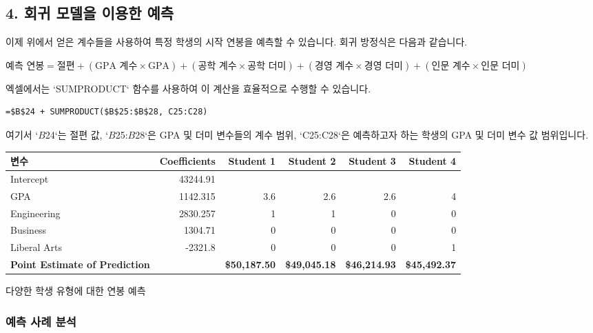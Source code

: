 \documentclass[11pt,a4paper]{article}
\begin{document}
\subsection*{4. 회귀 모델을 이용한 예측}

이제 위에서 얻은 계수들을 사용하여 특정 학생의 시작 연봉을 예측할 수 있습니다. 회귀 방정식은 다음과 같습니다.

$\text{예측 연봉} = \text{절편} + (\text{GPA 계수} \times \text{GPA}) + (\text{공학 계수} \times \text{공학 더미}) + (\text{경영 계수} \times \text{경영 더미}) + (\text{인문 계수} \times \text{인문 더미})$

엑셀에서는 `SUMPRODUCT` 함수를 사용하여 이 계산을 효율적으로 수행할 수 있습니다.

\begin{lstlisting}[caption={엑셀 SUMPRODUCT 함수를 이용한 예측 공식}, label={lst:sumproduct_formula}]
=$B$24 + SUMPRODUCT($B$25:$B$28, C25:C28)
\end{lstlisting}
여기서 `$B$24`는 절편 값, `$B$25:$B$28`은 GPA 및 더미 변수들의 계수 범위, `C25:C28`은 예측하고자 하는 학생의 GPA 및 더미 변수 값 범위입니다.

\begin{adjustbox}{width=\textwidth,center}
\begin{tabular}{lrrrrr}
\toprule
\textbf{변수} & \textbf{Coefficients} & \textbf{Student 1} & \textbf{Student 2} & \textbf{Student 3} & \textbf{Student 4} \\
\midrule
Intercept & 43244.91 & & & & \\
GPA & 1142.315 & 3.6 & 2.6 & 2.6 & 4 \\
Engineering & 2830.257 & 1 & 1 & 0 & 0 \\
Business & 1304.71 & 0 & 0 & 0 & 0 \\
Liberal Arts & -2321.8 & 0 & 0 & 0 & 1 \\
\midrule
\textbf{Point Estimate of Prediction} & & \textbf{\$50,187.50} & \textbf{\$49,045.18} & \textbf{\$46,214.93} & \textbf{\$45,492.37} \\
\bottomrule
\end{tabular}
\caption{다양한 학생 유형에 대한 연봉 예측}
\label{tab:prediction_examples}
\end{adjustbox}

\subsubsection*{예측 사례 분석}
\end{document}

